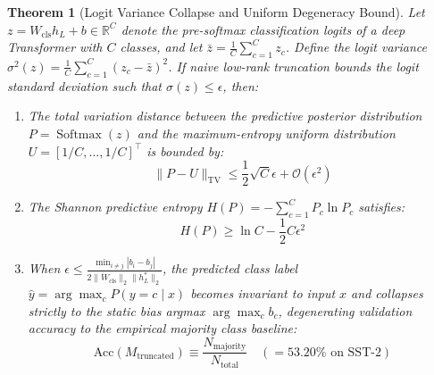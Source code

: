 \documentclass{article}
\newtheorem{theorem}{Theorem}
\begin{document}
\begin{theorem}[Logit Variance Collapse and Uniform Degeneracy Bound]
\label{thm:logit_variance_collapse}
Let $z = W_{\text{cls}} h_L + b \in \mathbb{R}^C$ denote the pre-softmax classification logits of a deep Transformer with $C$ classes, and let $\bar{z} = \frac{1}{C}\sum_{c=1}^C z_c$. Define the logit variance $\sigma^2(z) = \frac{1}{C}\sum_{c=1}^C (z_c - \bar{z})^2$. If naive low-rank truncation bounds the logit standard deviation such that $\sigma(z) \le \epsilon$, then:
\begin{enumerate}
    \item The total variation distance between the predictive posterior distribution $P = \operatorname{Softmax}(z)$ and the maximum-entropy uniform distribution $U = [1/C, \dots, 1/C]^\top$ is bounded by:
    \begin{equation}
        \|P - U\|_{\text{TV}} \le \frac{1}{2} \sqrt{C} \epsilon + \mathcal{O}(\epsilon^2)
    \end{equation}
    \item The Shannon predictive entropy $H(P) = -\sum_{c=1}^C P_c \ln P_c$ satisfies:
    \begin{equation}
        H(P) \ge \ln C - \frac{1}{2} C \epsilon^2
    \end{equation}
    \item When $\epsilon \le \frac{\min_{i \ne j} |b_i - b_j|}{2 \|W_{\text{cls}}\|_2 \|h_L^*\|_2}$, the predicted class label $\hat{y} = \arg\max_c P(y=c \mid x)$ becomes invariant to input $x$ and collapses strictly to the static bias argmax $\arg\max_c b_c$, degenerating validation accuracy to the empirical majority class baseline:
    \begin{equation}
        \text{Acc}(M_{\text{truncated}}) \equiv \frac{N_{\text{majority}}}{N_{\text{total}}} \quad (= 53.20\% \text{ on SST-2})
    \end{equation}
\end{enumerate}
\end{theorem}
\end{document}
